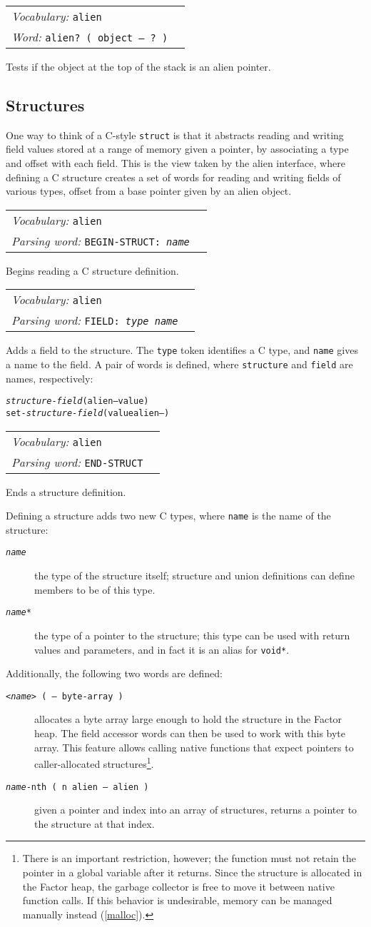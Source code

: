 \documentclass{book}
\newcommand{\vocabulary}[1]{\emph{Vocabulary:} \texttt{#1}&\\}
\newcommand{\parsingword}[2]{\index{\texttt{#1}}\emph{Parsing word:} \texttt{#2}&\\}
\newcommand{\ordinaryword}[2]{\index{\texttt{#1}}\emph{Word:} \texttt{#2}&\\}
\newcommand{\predword}[1]{\ordinaryword{#1}{#1~( object -- ?~)}}
\newcommand{\wordtable}[1]{


\begin{tabularx}{12cm}{lX}
\hline
#1
\hline
\end{tabularx}

}
\begin{document}
\wordtable{
\vocabulary{alien}
\predword{alien?}
}
Tests if the object at the top of the stack is an alien pointer.

\subsection{Structures}\label{alien-structs}

One way to think of a C-style \verb|struct| is that it abstracts reading and writing field values stored at a range of memory given a pointer, by associating a type and offset with each field. This is the view taken by the alien interface, where defining a C structure creates a set of words for reading and writing fields of various types, offset from a base pointer given by an alien object.

\wordtable{
\vocabulary{alien}
\parsingword{BEGIN-STRUCT:}{BEGIN-STRUCT: \emph{name}}
}
Begins reading a C structure definition.
\wordtable{
\vocabulary{alien}
\parsingword{FIELD:}{FIELD: \emph{type} \emph{name}}
}
Adds a field to the structure. The \verb|type| token identifies a C type, and \verb|name| gives a name to the field. A pair of words is defined, where \verb|structure| and \verb|field| are names, respectively:
\begin{alltt}
\emph{structure}-\emph{field} ( alien -- value )
set-\emph{structure}-\emph{field} ( value alien -- )
\end{alltt}

\wordtable{
\vocabulary{alien}
\parsingword{END-STRUCT}{END-STRUCT}
}
Ends a structure definition.

Defining a structure adds two new C types, where \verb|name| is the name of the structure:
\begin{description}
\item[\texttt{\emph{name}}] the type of the structure itself; structure and union definitions can define members to be of this type.
\item[\texttt{\emph{name}*}] the type of a pointer to the structure; this type can be used with return values and parameters, and in fact it is an alias for \texttt{void*}.
\end{description}
Additionally, the following two words are defined:
\begin{description}
\item[\texttt{<\emph{name}> ( -- byte-array )}] allocates a byte array large enough to hold the structure in the Factor heap. The field accessor words can then be used to work with this byte array. This feature allows calling native functions that expect pointers to caller-allocated structures\footnote{
There is an important restriction, however; the function must not retain the pointer in a global variable after it returns. Since the structure is allocated in the Factor heap, the garbage collector is free to move it between native function calls. If this behavior is undesirable, memory can be managed manually instead (\ref{malloc}).}.
\item[\texttt{\emph{name}-nth ( n alien -- alien )}] given a pointer and index into an array of structures, returns a pointer to the structure at that index.
\end{description}
\end{document}

